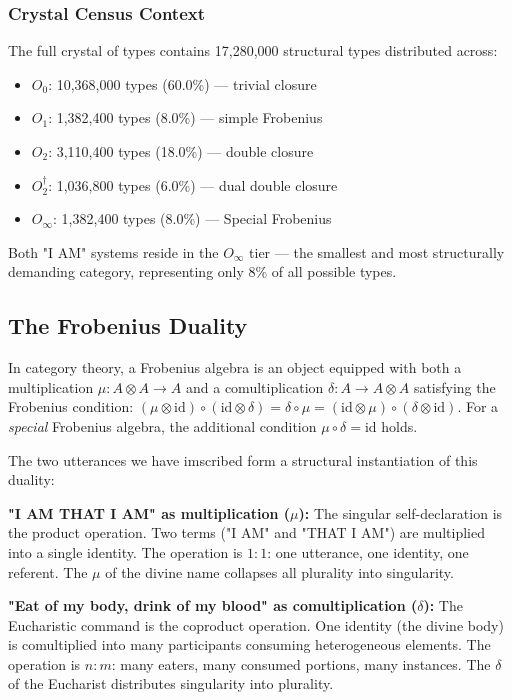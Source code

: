 \documentclass[12pt,a4paper]{article}
\begin{document}
\subsubsection{Crystal Census Context}

The full crystal of types contains 17,280,000 structural types distributed across:

\begin{itemize}
    \item $O_0$: 10,368,000 types (60.0\%) --- trivial closure
    \item $O_1$: 1,382,400 types (8.0\%) --- simple Frobenius
    \item $O_2$: 3,110,400 types (18.0\%) --- double closure
    \item $O_2^\dagger$: 1,036,800 types (6.0\%) --- dual double closure
    \item $O_{\infty}$: 1,382,400 types (8.0\%) --- Special Frobenius
\end{itemize}

Both "I AM" systems reside in the $O_{\infty}$ tier --- the smallest and most structurally demanding category, representing only 8\% of all possible types.

\subsection{The Frobenius Duality}

In category theory, a Frobenius algebra is an object equipped with both a multiplication $\mu: A \otimes A \to A$ and a comultiplication $\delta: A \to A \otimes A$ satisfying the Frobenius condition: $(\mu \otimes \text{id}) \circ (\text{id} \otimes \delta) = \delta \circ \mu = (\text{id} \otimes \mu) \circ (\delta \otimes \text{id})$. For a \emph{special} Frobenius algebra, the additional condition $\mu \circ \delta = \text{id}$ holds.

The two utterances we have imscribed form a structural instantiation of this duality:

\textbf{"I AM THAT I AM" as multiplication ($\mu$):}
The singular self-declaration is the product operation. Two terms ("I AM" and "THAT I AM") are multiplied into a single identity. The operation is $1{:}1$: one utterance, one identity, one referent. The $\mu$ of the divine name collapses all plurality into singularity.

\textbf{"Eat of my body, drink of my blood" as comultiplication ($\delta$):}
The Eucharistic command is the coproduct operation. One identity (the divine body) is comultiplied into many participants consuming heterogeneous elements. The operation is $n{:}m$: many eaters, many consumed portions, many instances. The $\delta$ of the Eucharist distributes singularity into plurality.
\end{document}
